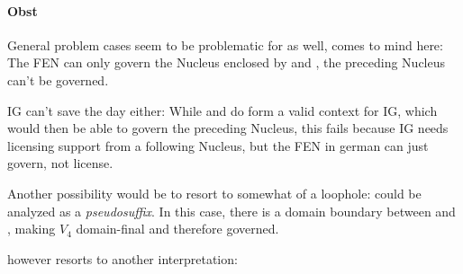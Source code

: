 
\paragraph{Obst}
General problem cases seem to be problematic for
\CVCV as well,  %
comes to mind here:
The \gls{FEN} can only govern the Nucleus enclosed by
\ti{[s]} and \ti{[t]}, the preceding Nucleus can't be governed.

\begin{structure}{ \ti{[Po:pst]}}
  \wordstart
  \emptyV[nogov]
  \emptyV[gov]
  \fen
\end{structure}

\gls{IG} can't save the day either:
While \ti{[s]} and \ti{[t]} do form a valid context for \gls{IG},
which would then be able to govern the preceding Nucleus,
this fails because \gls{IG} needs licensing support from a following
Nucleus, but the \gls{FEN} in german can just govern, not license.

Another possibility would be to resort to somewhat of a loophole:
\ti{[st]} could be analyzed as a \emph{pseudosuffix}.
In this case, there is a domain boundary between \ti{[p]}
and \ti{[s]}, making $V_4$
domain-final and therefore governed.

\Cite{scheer2004} however resorts to another interpretation:

